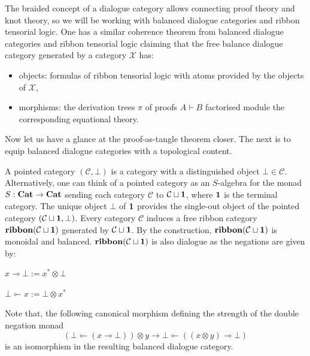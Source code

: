 \documentclass[8pt]{article}
\theoremstyle{definition}
\theoremstyle{definition}
\theoremstyle{definition}
\theoremstyle{definition}
\theoremstyle{definition}
\theoremstyle{definition}
\theoremstyle{definition}
\theoremstyle{definition}
\theoremstyle{definition}
\theoremstyle{definition}
\theoremstyle{definition}
\theoremstyle{definition}
\theoremstyle{definition}
\theoremstyle{definition}
\theoremstyle{question}
\begin{document}
The braided concept of a dialogue category allows connecting proof theory and knot theory, so we will be working
with balanced dialogue categories and ribbon tensorial logic. One has a similar coherence theorem from balanced dialogue categories and ribbon tensorial logic
claiming that the free balance dialogue category generated by a category $\mathcal{X}$ has:
\begin{itemize}
  \item objects: formulas of ribbon tensorial logic with atoms provided by the objects of $\mathcal{X}$,
  \item morphisms: the derivation trees $\pi$ of proofs $A \vdash B$ factorised module the corresponding equational theory.
\end{itemize}

Now let us have a glance at the proof-as-tangle theorem closer. The next is to equip balanced dialogue categories
with a topological content. 

A pointed category $(\mathcal{C}, \bot)$ is a category with a distinguished object $\bot \in \mathcal{C}$.
Alternatively, one can think of a pointed category as an $S$-algebra for the monad $S : {\bf Cat} \to {\bf Cat}$
sending each category $\mathcal{C}$ to $\mathcal{C} \sqcup {\bf 1}$, where ${\bf 1}$ is the terminal category.
The unique object $\bot$ of ${\bf 1}$ provides the single-out object of the pointed category $(\mathcal{C} \sqcup {\bf 1}, \bot)$.
Every category $\mathcal{C}$ induces a free ribbon category ${\bf ribbon}(\mathcal{C} \sqcup {\bf 1})$
generated by $\mathcal{C} \sqcup {\bf 1}$. By the construction,  ${\bf ribbon}(\mathcal{C} \sqcup {\bf 1})$ is monoidal and balanced.
${\bf ribbon}(\mathcal{C} \sqcup {\bf 1})$ is also dialogue as the negations are given by:
\begin{center}
  $x \multimap \bot := x^* \otimes \bot$

  $\bot \multimapinv x := \bot \otimes x^*$
\end{center}
Note that, the following canonical morphism defining the strength of the double negation monad
\[
(\bot \multimapinv (x \multimap \bot)) \otimes y \to \bot \multimapinv ((x \otimes y) \multimap \bot)
\]
is an isomorphism in the resulting balanced dialogue category.
\end{document}
